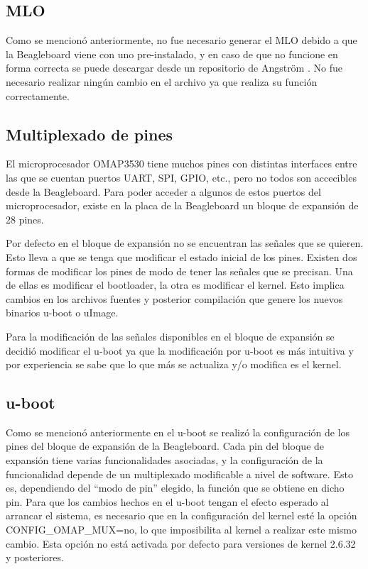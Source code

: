 \subsection{MLO}
Como se mencionó anteriormente, no fue necesario generar el MLO debido a que la Beagleboard viene con uno pre-instalado, y en caso de que no funcione en forma correcta se puede descargar desde un repositorio de Angström \cite{Angs_MLO}. No fue necesario realizar ningún cambio en el archivo ya que realiza su función correctamente.

\subsection{Multiplexado de pines}
El microprocesador OMAP3530 tiene muchos pines con distintas interfaces entre las
que se cuentan puertos UART, SPI, GPIO, etc., pero no todos son accecibles desde la Beagleboard. 
Para poder acceder a algunos de estos puertos del microprocesador, existe en la placa de la
Beagleboard un bloque de expansión de 28 pines.

\bigskip
Por defecto en el bloque de expansión no se encuentran las señales que se quieren. Esto 
lleva a que se tenga que modificar el estado inicial de los pines. 
Existen dos formas de modificar los pines de modo de tener las señales que se precisan. Una de ellas es modificar el bootloader, la otra es modificar el kernel. Esto implica cambios
en los archivos fuentes y posterior compilación que genere los nuevos binarios u-boot o uImage. 

\bigskip
Para la modificación de las señales disponibles en el bloque de expansión se decidió modificar el u-boot ya que la modificación por u-boot es más intuitiva y por experiencia se sabe que lo que más se actualiza y/o modifica es el kernel. 

\subsection{u-boot}
Como se mencionó anteriormente en el u-boot se realizó la configuración de los pines del bloque de expansión de la Beagleboard. 
Cada pin del bloque de expansión tiene varias funcionalidades asociadas, y la configuración de la 
funcionalidad depende de un multiplexado modificable a nivel de software. Esto es, dependiendo del “modo de pin” elegido, la función que se obtiene en dicho pin.
Para que los cambios hechos en el u-boot tengan el efecto esperado al arrancar el sistema, es necesario que en la configuración del kernel esté la opción CONFIG\_OMAP\_MUX=no, lo que imposibilita al kernel a realizar este mismo cambio. Esta opción no está activada por defecto para versiones de kernel 2.6.32 y posteriores. 

